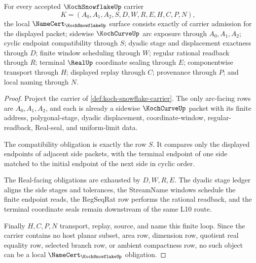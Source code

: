 \begin{theorem}
\label{thm:koch-snowflake-namecert-obligations}
For every accepted $\KochSnowflakeUp$ carrier
$$
K=(A_0,A_1,A_2,S,D,W,R,E,H,C,P,N),
$$
the local $\NameCert_{\KochSnowflakeUp}$ surface consists exactly of carrier admission for the displayed packet; sidewise $\KochCurveUp$ arc exposure through $A_0,A_1,A_2$; cyclic endpoint compatibility through $S$; dyadic stage and displacement exactness through $D$; finite window scheduling through $W$; regular rational readback through $R$; terminal $\RealUp$ coordinate sealing through $E$; componentwise transport through $H$; displayed replay through $C$; provenance through $P$; and local naming through $N$.
\end{theorem}
\begin{proof}
Project the carrier of \autoref{def:koch-snowflake-carrier}. The only arc-facing rows are $A_0,A_1,A_2$, and each is already a sidewise $\KochCurveUp$ packet with its finite address, polygonal-stage, dyadic displacement, coordinate-window, regular-readback, Real-seal, and uniform-limit data.

The compatibility obligation is exactly the row $S$. It compares only the displayed endpoints of adjacent side packets, with the terminal endpoint of one side matched to the initial endpoint of the next side in cyclic order.

The Real-facing obligations are exhausted by $D,W,R,E$. The dyadic stage ledger aligns the side stages and tolerances, the StreamName windows schedule the finite endpoint reads, the RegSeqRat row performs the rational readback, and the terminal coordinate seals remain downstream of the same L10 route.

Finally $H,C,P,N$ transport, replay, source, and name this finite loop. Since the carrier contains no host planar subset, area row, dimension row, quotient real equality row, selected branch row, or ambient compactness row, no such object can be a local $\NameCert_{\KochSnowflakeUp}$ obligation.
\end{proof}

